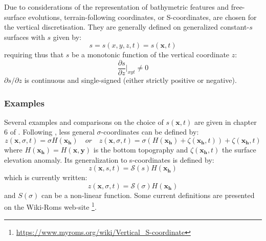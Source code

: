 Due to considerations of the representation of bathymetric features and free-surface evolutions, terrain-following coordinates, or S-coordinates, are chosen for the vertical discretisation. They are generally defined on generalized constant-$s$ surfaces with $s$ given by:
\begin{equation}
 \displaystyle
 s=s(x,y,z,t)=s(\mathbf{x},t)
\end{equation}
requiring thus that $s$ be a monotonic function of the vertical coordinate $z$:
\begin{equation}
 \displaystyle
 \frac{\partial s}{\partial z}\bigg\vert_{xyt}\ne 0
\end{equation}
$\partial s / \partial z$ is continuous and single-signed (either strictly positive or negative).

\subsubsection{Examples}
Several examples and comparisons on the choice of $s(\mathbf{x},t)$ are given in chapter 6 of \citet{griffies_fundamentals_2004}.
Following  \citet{shchepetkin_regional_2005},  less general $\sigma$-coordinates can be defined by:
\begin{equation}
 \displaystyle
 z(\mathbf{x},\sigma,t)=\sigma H(\mathbf{x_h})\quad or\quad z(\mathbf{x},\sigma,t)=\sigma(H(\mathbf{x_h})+\zeta(\mathbf{x_h},t))+\zeta(\mathbf{x_h},t)
\end{equation}
where $H(\mathbf{x_h})=H(\mathbf{x,y})$ is the bottom topography and $\zeta(\mathbf{x_h},t)$ the surface elevation anomaly. Its generalization to s-coordinates is defined by:
\begin{equation}
 \displaystyle
 z(\mathbf{x},s,t)=\mathcal{S}(s) H(\mathbf{x_h})
\end{equation}
which is currently written:
\begin{equation}
 \displaystyle
 z(\mathbf{x},\sigma,t)=\mathcal{S}(\sigma) H(\mathbf{x_h})
\end{equation}
and $S(\sigma)$ can be a non-linear function. Some current definitions are presented on the Wiki-Roms web-site \footnote{\url{https://www.myroms.org/wiki/Vertical_S-coordinate}}.


